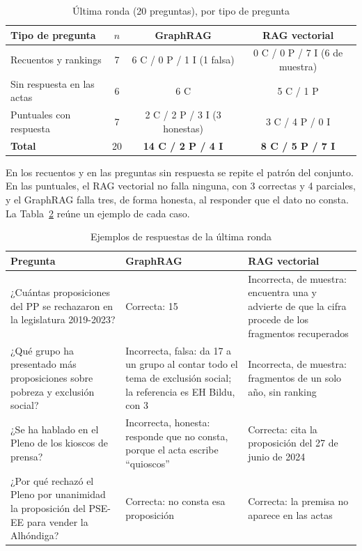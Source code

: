 \documentclass[11pt, a4paper]{report}
\begin{document}
	\begin{table}[H]
		\centering
		\begin{tabularx}{\linewidth}{|>{\raggedright\arraybackslash}X|c|c|c|}
			\hline
			\rowcolor{tabla-header}
			\textbf{Tipo de pregunta} & \textbf{$n$} & \textbf{GraphRAG} & \textbf{RAG vectorial} \\
			\hline
			Recuentos y rankings & 7 & 6 C / 0 P / 1 I (1 falsa) & 0 C / 0 P / 7 I (6 de muestra) \\
			\hline
			\rowcolor{fila-alterna}
			Sin respuesta en las actas & 6 & 6 C & 5 C / 1 P \\
			\hline
			Puntuales con respuesta & 7 & 2 C / 2 P / 3 I (3 honestas) & 3 C / 4 P / 0 I \\
			\hline
			\rowcolor{fila-alterna}
			\textbf{Total} & 20 & \textbf{14 C / 2 P / 4 I} & \textbf{8 C / 5 P / 7 I} \\
			\hline
		\end{tabularx}
		\caption{Última ronda (20 preguntas), por tipo de pregunta}
		\label{tab:indep-tipo}
	\end{table}

	En los recuentos y en las preguntas sin respuesta se repite el patrón del
	conjunto. En las puntuales, el RAG vectorial no falla ninguna, con 3 correctas
	y 4 parciales, y el GraphRAG falla tres, de forma honesta, al responder que el dato no consta. La Tabla~\ref{tab:indep-ejemplos} reúne un
	ejemplo de cada caso.

	\begin{table}[H]
		\centering
		\begin{tabularx}{\linewidth}{|>{\raggedright\arraybackslash}X|>{\raggedright\arraybackslash}X|>{\raggedright\arraybackslash}X|}
			\hline
			\rowcolor{tabla-header}
			\textbf{Pregunta} & \textbf{GraphRAG} & \textbf{RAG vectorial} \\
			\hline
			¿Cuántas proposiciones del PP se rechazaron en la legislatura 2019-2023? & Correcta: 15 & Incorrecta, de muestra: encuentra una y advierte de que la cifra procede de los fragmentos recuperados \\
			\hline
			\rowcolor{fila-alterna}
			¿Qué grupo ha presentado más proposiciones sobre pobreza y exclusión social? & Incorrecta, falsa: da 17 a un grupo al contar todo el tema de exclusión social; la referencia es EH Bildu, con 3 & Incorrecta, de muestra: fragmentos de un solo año, sin ranking \\
			\hline
			¿Se ha hablado en el Pleno de los kioscos de prensa? & Incorrecta, honesta: responde que no consta, porque el acta escribe ``quioscos'' & Correcta: cita la proposición del 27 de junio de 2024 \\
			\hline
			\rowcolor{fila-alterna}
			¿Por qué rechazó el Pleno por unanimidad la proposición del PSE-EE para vender la Alhóndiga? & Correcta: no consta esa proposición & Correcta: la premisa no aparece en las actas \\
			\hline
		\end{tabularx}
		\caption{Ejemplos de respuestas de la última ronda}
		\label{tab:indep-ejemplos}
	\end{table}
\end{document}
